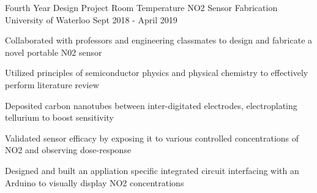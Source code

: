 

\begin{cventries}


  \cventry
    {Fourth Year Design Project} %
    {Room Temperature NO2 Sensor Fabrication} %
    {University of Waterloo} %
    {Sept 2018 - April 2019} %
    {
      \begin{cvitems} %
        \item Collaborated with professors and engineering classmates to design and fabricate a novel portable N02 sensor
        \item Utilized principles of semiconductor physics and physical chemistry to effectively perform literature review 
        \item Deposited carbon nanotubes between inter-digitated electrodes, electroplating tellurium to boost sensitivity 
        \item Validated sensor efficacy by exposing it to various controlled concentrations of NO2 and observing dose-response
        \item Designed and built an appliation specific integrated circuit interfacing with an Arduino to visually display NO2 concentrations
      \end{cvitems}
    }



\end{cventries}


